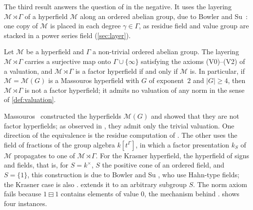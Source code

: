 \documentclass[11pt]{amsart}
\numberwithin{equation}{section}
\newcommand{\hminus}{\boxminus}
\newcommand{\Mas}{\mathcal M}
\begin{document}
The third result answers the question of \cite[\S7(2)]{Linzi25} in the negative. It uses the layering $\Mas\rtimes\Gamma$ of a hyperfield $\Mas$ along an ordered abelian group, due to Bowler and Su~\cite[Definition~4.1]{BowlerSu21}: one copy of $\Mas$ is placed in each degree $\gamma\in\Gamma$, as residue field and value group are stacked in a power series field (\cref{sec:layer}).

\begin{introthm}\label{thm:transfer}
Let $\Mas$ be a hyperfield and $\Gamma$ a non-trivial ordered abelian group. The layering $\Mas\rtimes\Gamma$ carries a surjective map onto $\Gamma\cup\{\infty\}$ satisfying the axioms \textup{(V0)--(V2)} of a valuation, and $\Mas\rtimes\Gamma$ is a factor hyperfield if and only if $\Mas$ is. In particular, if $\Mas=\Mas(G)$ is a Massouros hyperfield with $G$ of exponent~$2$ and $|G|\ge4$, then $\Mas\rtimes\Gamma$ is not a factor hyperfield; it admits no valuation of any norm in the sense of \cref{def:valuation}.
\end{introthm}

Massouros~\cite{Massouros85} constructed the hyperfields $\Mas(G)$ and showed that they are not factor hyperfields; as observed in \cite[\S7(2)]{Linzi25}, they admit only the trivial valuation. One direction of the equivalence is the residue computation of \cite[Lemma~3.6 and Proposition~3.14]{Linzi25}. The other uses the field of fractions of the group algebra $k[t^\Gamma]$, in which a factor presentation $k_S$ of $\Mas$ propagates to one of $\Mas\rtimes\Gamma$. For the Krasner hyperfield, the hyperfield of signs and fields, that is, for $S=k^\times$, $S$ the positive cone of an ordered field, and $S=\{1\}$, this construction is due to Bowler and Su \cite[proof of Theorem~7.5, Cases~1--3]{BowlerSu21}, who use Hahn-type fields; the Krasner case is also \cite[Proposition~2.17(iv)]{Linzi25}.  extends it to an arbitrary subgroup $S$. The norm axiom fails because $1\hminus1$ contains elements of value $0$, the mechanism behind \cite[Proposition~4.14]{Linzi25}.  shows four instances.
\end{document}
